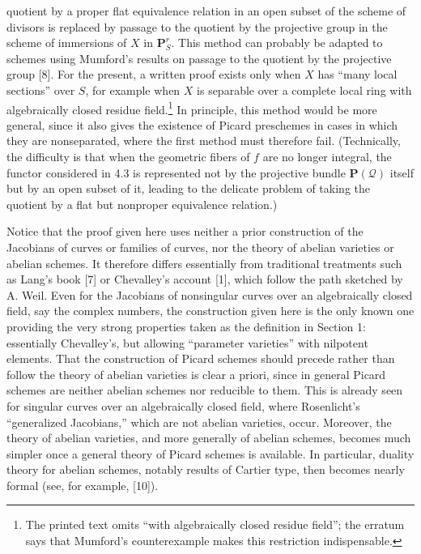 quotient by a proper flat equivalence relation in an open subset of the scheme
of divisors is replaced by passage to the quotient by the projective group in
the scheme of immersions of $X$ in $\mathbf P^r_S$. This method can probably
be adapted to schemes using Mumford's results on passage to the quotient by
the projective group [8]. For the present, a written proof exists only when
$X$ has “many local sections” over $S$, for example when $X$ is separable over
a complete local ring with algebraically closed residue
field.\footnote{The printed text omits “with algebraically closed residue
field”; the erratum says that Mumford's counterexample makes this restriction
indispensable.} In principle, this method would be more general, since
it also gives the existence of Picard preschemes in cases in which they are
nonseparated, where the first method must therefore fail. (Technically, the
difficulty is that when the geometric fibers of $f$ are no longer integral,
the functor considered in 4.3 is represented not by the projective bundle
$\mathbf P(\mathcal Q)$ itself but by an open subset of it, leading to the
delicate problem of taking the quotient by a flat but nonproper equivalence
relation.)

 Notice that the proof given here uses neither a prior
construction of the Jacobians of curves or families of curves, nor the theory
of abelian varieties or abelian schemes. It therefore differs essentially
from traditional treatments such as Lang's book [7] or Chevalley's account
[1], which follow the path sketched by A. Weil. Even for the Jacobians of
nonsingular curves over an algebraically closed field, say the complex
numbers, the construction given here is the only known one providing the very
strong properties taken as the definition in Section 1: essentially
Chevalley's, but allowing “parameter varieties” with nilpotent elements. That
the construction of Picard schemes should precede rather than follow the
theory of abelian varieties is clear a priori, since in general Picard schemes
are neither abelian schemes nor reducible to them. This is already seen for
singular curves over an algebraically closed field, where Rosenlicht's
“generalized Jacobians,” which are not abelian varieties, occur. Moreover, the
theory of abelian varieties, and more generally of abelian schemes, becomes
much simpler once a general theory of Picard schemes is available. In
particular, duality theory for abelian schemes, notably results of Cartier
type, then becomes nearly formal (see, for example, [10]).

